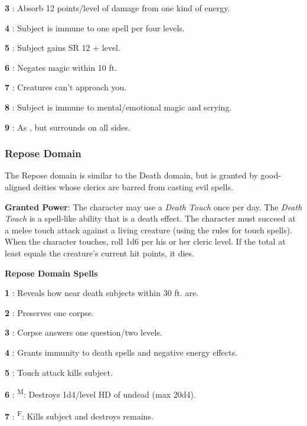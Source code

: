 \textbf{3} : Absorb 12 points/level of damage from one kind of energy.

\textbf{4} : Subject is immune to one spell per four levels.

\textbf{5} : Subject gains SR 12 + level.

\textbf{6} : Negates magic within 10 ft.

\textbf{7} : Creatures can't approach you.

\textbf{8} : Subject is immune to mental/emotional magic and scrying.

\textbf{9} : As , but surrounds on all sides.

\subsubsection{Repose Domain}

The Repose domain is similar to the Death domain, but is granted by good-aligned deities whose clerics are barred from casting evil spells.

\textbf{Granted Power}: The character may use a \textit{Death Touch} once per day. The \textit{Death Touch} is a spell-like ability that is a death effect. The character must succeed at a melee touch attack against a living creature (using the rules for touch spells). When the character touches, roll 1d6 per his or her cleric level. If the total at least equals the creature's current hit points, it dies.

\textbf{Repose Domain Spells}

\textbf{1} : Reveals how near death subjects within 30 ft. are.

\textbf{2} : Preserves one corpse.

\textbf{3} : Corpse answers one question/two levels.

\textbf{4} : Grants immunity to death spells and negative energy effects.

\textbf{5} : Touch attack kills subject.

\textbf{6} : \textsuperscript{M}: Destroys 1d4/level HD of undead (max 20d4).

\textbf{7} : \textsuperscript{F}: Kills subject and destroys remains.

